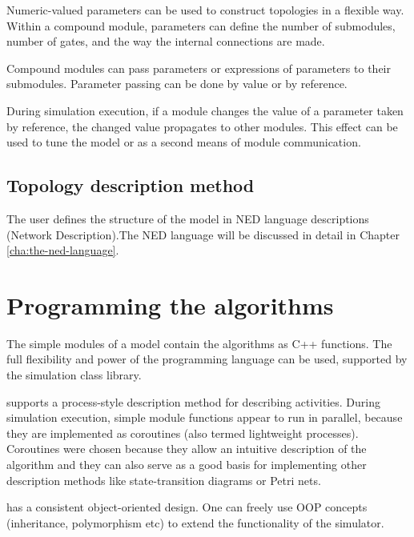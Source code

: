 Numeric-valued parameters can be used to construct topologies in a
flexible way. Within a compound module, parameters can define the
number of submodules, number of gates, and the way the internal
connections are made.


Compound modules can pass parameters or expressions of parameters
to their submodules. Parameter passing can be done by value or
by reference.

During simulation execution, if a module changes the value of
a parameter taken by reference, the changed value propagates
to other modules. This effect can be used to tune the model or
as a second means of module communication.


\subsection{Topology description method}
The user defines the structure of the model in NED language descriptions
(Network Description).The NED language will be discussed in detail
in Chapter \ref{cha:the-ned-language}.


\section{Programming the algorithms}

The simple modules of a model contain the algorithms as C++ functions.
The full flexibility and power of the programming language can
be used, supported by the {\opp} simulation class library.


{\opp} supports a process-style description method for describing
activities. During simulation execution, simple module functions
appear to run in parallel, because they are implemented as coroutines
(also termed lightweight processes). Coroutines were chosen because
they allow an intuitive description of the algorithm and they
can also serve as a good basis for implementing other description
methods like state-transition diagrams or Petri nets.

{\opp} has a consistent object-oriented design. One can freely
use OOP concepts (inheritance, polymorphism etc) to extend the
functionality of the simulator.

